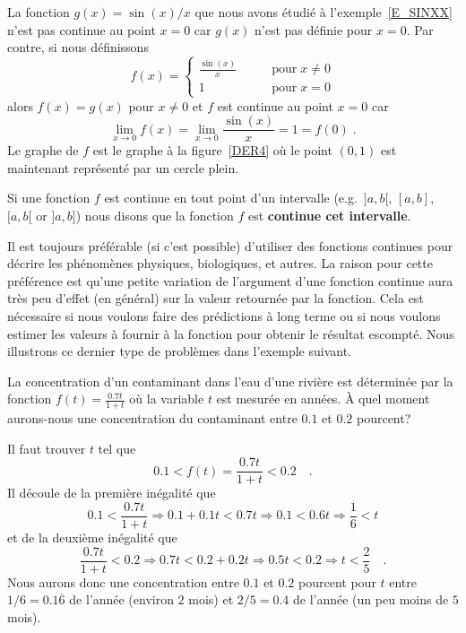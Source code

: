 {\begin{egg}
La fonction $g(x) = \sin(x)/x$ que nous avons étudié à
l'exemple~\ref{E_SINXX} n'est pas continue au point $x=0$ car $g(x)$
n'est pas définie pour $x=0$. Par contre, si nous définissons
\[
f(x) = \begin{cases}
\displaystyle \frac{\sin(x)}{x} & \qquad \text{pour} \; x\neq 0 \\
1 & \qquad \text{pour} \; x = 0
\end{cases}
\]
alors $f(x) = g(x)$ pour $x\neq 0$ et $f$ est continue au point $x=0$
car
\[
\lim_{x \rightarrow 0} f(x) = \lim_{x\rightarrow 0} \frac{\sin(x)}{x}
= 1 = f(0) \; .
\]
Le graphe de $f$ est le graphe à la figure~\ref{DER4} où le point
$(0,1)$ est maintenant représenté par un cercle plein.
\end{egg}

\begin{focus}{\dfn} 
Si une fonction $f$ est continue en tout point d'un intervalle
(e.g.\ $]a,b[$, $[a,b]$, $[a,b[$ or $]a,b]$) nous disons que la fonction
$f$ est {\bfseries continue cet intervalle}.
\end{focus}

Il est toujours préférable (si c'est possible) d'utiliser des
fonctions continues pour décrire les phénomènes physiques,
biologiques, et autres.  La raison pour cette préférence est qu'une
petite variation de l'argument d'une fonction continue aura très peu
d'effet (en général) sur la valeur retournée par la fonction.  Cela
est nécessaire si nous voulons faire des prédictions à long terme ou si
nous voulons estimer les valeurs à fournir à la fonction pour obtenir le
résultat escompté.  Nous illustrons ce dernier type de problèmes dans
l'exemple suivant.

\begin{egg}[\life]
La concentration d'un contaminant dans l'eau d'une rivière est
déterminée par la fonction
$\displaystyle f(t) = \frac{0.7 t}{1+t}$ où la variable $t$ est mesurée
en années.  À quel moment aurons-nous une concentration du contaminant
entre $0.1$ et $0.2$ pourcent?

Il faut trouver $t$ tel que
\[
  0.1 < f(t) = \frac{0.7t}{1+t} < 0.2 \quad .
\]
Il découle de la première inégalité que
\[
  0.1 < \frac{0.7t}{1+t} \Rightarrow 0.1 + 0.1 t < 0.7 t
  \Rightarrow 0.1 < 0.6 t \Rightarrow \frac{1}{6} < t
\]
et de la deuxième inégalité que
\[
  \frac{0.7t}{1+t} < 0.2 \Rightarrow 0.7 t < 0.2 + 0.2 t
  \Rightarrow 0.5 t < 0.2 \Rightarrow t < \frac{2}{5} \quad .
\]
Nous aurons donc une concentration entre $0.1$ et $0.2$ pourcent pour
$t$ entre $1/6 = 0.1\overline{6}$ de l'année (environ $2$ mois) et
$2/5 = 0.4$ de l'année (un peu moins de $5$ mois).


\end{egg}}
